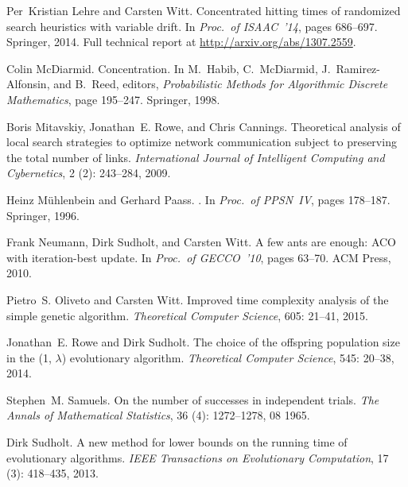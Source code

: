 \documentclass[11pt, a4paper]{article}
\begin{document}
\begin{thebibliography}{29}
Per~Kristian Lehre and Carsten Witt.
\newblock Concentrated hitting times of randomized search heuristics with
  variable drift.
\newblock In \emph{Proc.\ of ISAAC~'14}, pages 686--697. Springer, 2014.
\newblock Full technical report at \url{http://arxiv.org/abs/1307.2559}.

Colin McDiarmid.
\newblock Concentration.
\newblock In M.~Habib, C.~McDiarmid, J.~Ramirez-Alfonsin, and B.~Reed, editors,
  \emph{Probabilistic Methods for Algorithmic Discrete Mathematics}, page
  195–247. Springer, 1998.

Boris Mitavskiy, Jonathan~E. Rowe, and Chris Cannings.
\newblock Theoretical analysis of local search strategies to optimize network
  communication subject to preserving the total number of links.
\newblock \emph{International Journal of Intelligent Computing and
  Cybernetics}, 2 (2): 243--284, 2009.

Heinz M\"{u}hlenbein and Gerhard Paass.
.
\newblock In \emph{Proc.~of PPSN~IV}, pages 178--187. Springer, 1996.

Frank Neumann, Dirk Sudholt, and Carsten Witt.
\newblock A few ants are enough: {ACO} with iteration-best update.
\newblock In \emph{Proc.\ of GECCO~'10}, pages 63--70. ACM Press, 2010.

Pietro~S. Oliveto and Carsten Witt.
\newblock Improved time complexity analysis of the simple genetic algorithm.
\newblock \emph{Theoretical Computer Science}, 605: 21--41, 2015.

Jonathan~E. Rowe and Dirk Sudholt.
\newblock The choice of the offspring population size in the (1, {\(\lambda\)})
  evolutionary algorithm.
\newblock \emph{Theoretical Computer Science}, 545: 20--38, 2014.

Stephen~M. Samuels.
\newblock On the number of successes in independent trials.
\newblock \emph{The Annals of Mathematical Statistics}, 36
  (4): 1272--1278, 08 1965.

Dirk Sudholt.
\newblock A new method for lower bounds on the running time of evolutionary
  algorithms.
\newblock \emph{IEEE Transactions on Evolutionary Computation}, 17
  (3): 418--435, 2013.


\end{thebibliography}
\end{document}

